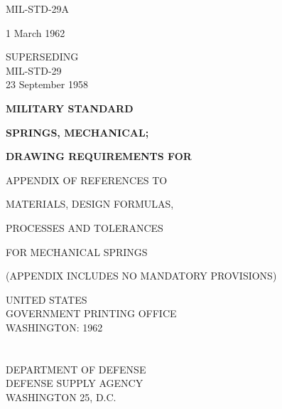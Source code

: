 \documentclass[10pt]{article}
\begin{document}
\begin{titlepage}
    \centering

    {\Large MIL-STD-29A \

\vspace{6pt} 1 March 1962 \par}

    \vspace{1cm}

    {\large SUPERSEDING \\ MIL-STD-29 \\ 23 September 1958 \par}

    \vfill

    {\Huge \textbf{MILITARY STANDARD} \par}
    \vspace{0.5cm}
    {\LARGE \textbf{SPRINGS, MECHANICAL;} \

\vspace{4pt}
    \textbf{DRAWING REQUIREMENTS FOR} \par}

    \vspace{1cm}

    {\Large APPENDIX OF REFERENCES TO \

\vspace{4pt}
    MATERIALS, DESIGN FORMULAS, \

\vspace{4pt}
    PROCESSES AND TOLERANCES \

\vspace{4pt}
    FOR MECHANICAL SPRINGS \par}

    \vspace{0.5cm}
    {\large (APPENDIX INCLUDES NO MANDATORY PROVISIONS) \par}

    \vfill

    {\large UNITED STATES \\ GOVERNMENT PRINTING OFFICE \\ WASHINGTON: 1962 \par}

\end{titlepage}

\section*{}
\begin{center}
DEPARTMENT OF DEFENSE \\
DEFENSE SUPPLY AGENCY \\
WASHINGTON 25, D.C.
\end{center}
\end{document}
